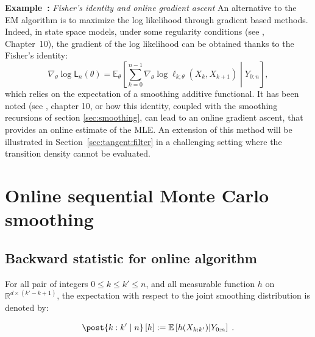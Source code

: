 \documentclass{article}
\newcommand{\llh}[1]{\mathsf{L}_{#1}}
\newcommand{\parvec}{\theta}
\newcommand{\deriv}{\nabla_{\parvec}}
\def\pE{\mathbb{E}}
\newcommand{\rset}{\ensuremath{\mathbb{R}}}
\newcommand{\eqsp}{\;}
\newcommand{\qg}[1]{\ell_{#1}}
\newcounter{example}[section]
\newenvironment{example}[1][]{\refstepcounter{example}\par\medskip
   \noindent \textbf{Example~\theexample:} \textit{#1} \text \rmfamily}{\medskip}
\begin{document}
\begin{example}[Fisher's identity and online gradient ascent]
An alternative to the EM algorithm is to maximize the log likelihood through gradient based methods.
Indeed, in state space models, under some regularity conditions (see \cite{cappe2005inference}, Chapter~10), the gradient of the log likelihood can be obtained thanks to the Fisher's identity:
$$\deriv \log \llh{n}(\parvec) = \pE_\theta\left[\sum_{k=0}^{n-1} \deriv \log \qg{k;\parvec}(X_{k},X_{k+1})\middle | Y_{0:n}\right],$$
which relies on the expectation of a smoothing additive functional.
It has been noted (see \cite{cappe2005inference}, chapter 10, or \cite{olsson2020particle} how this identity, coupled with the smoothing recursions of section \ref{sec:smoothing}, can lead to an online gradient ascent, that provides an online estimate of the MLE.
An extension of this method will be illustrated in Section~\ref{sec:tangent:filter} in a challenging setting where the transition density cannot be evaluated.
\end{example}

\section{Online sequential Monte Carlo smoothing}
\label{sec:method}

\subsection{Backward statistic for online algorithm}

For all pair of integers $0\leq k \leq k' \leq n$, and all measurable function $h$ on $\rset^{d \times (k' - k + 1)}$, the expectation with respect to the joint smoothing distribution is denoted by:

$$\post{k:k' \mid n} \left[ h \right] := \pE\left[ h(X_{k:k'}) \middle | Y_{0:n} \right]\eqsp .$$
\end{document}
